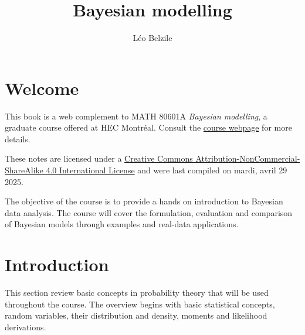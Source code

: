 \documentclass[
  11pt,
  letterpaper,
]{scrbook}
\title{Bayesian modelling}
\author{Léo Belzile}
\date{}
\renewcommand*\contentsname{Table of contents}
\newcommand\contentsname{Table of contents}
\theoremstyle{definition}
\theoremstyle{plain}
\theoremstyle{plain}
\theoremstyle{plain}
\theoremstyle{definition}
\theoremstyle{definition}
\theoremstyle{remark}
\begin{document}
\frontmatter
\maketitle

\renewcommand*\contentsname{Table of contents}
{
\setcounter{tocdepth}{2}
\tableofcontents
}

\mainmatter
{}

\chapter*{Welcome}\label{welcome}


This book is a web complement to MATH 80601A \emph{Bayesian modelling},
a graduate course offered at HEC Montréal. Consult the
\href{https://lbelzile.github.io/bayesmod}{course webpage} for more
details.

These notes are licensed under a
\href{http://creativecommons.org/licenses/by-nc-sa/4.0/}{Creative
Commons Attribution-NonCommercial-ShareAlike 4.0 International License}
and were last compiled on mardi, avril 29 2025.

The objective of the course is to provide a hands on introduction to
Bayesian data analysis. The course will cover the formulation,
evaluation and comparison of Bayesian models through examples and
real-data applications.


\chapter{Introduction}\label{introduction}

This section review basic concepts in probability theory that will be
used throughout the course. The overview begins with basic statistical
concepts, random variables, their distribution and density, moments and
likelihood derivations.
\end{document}

